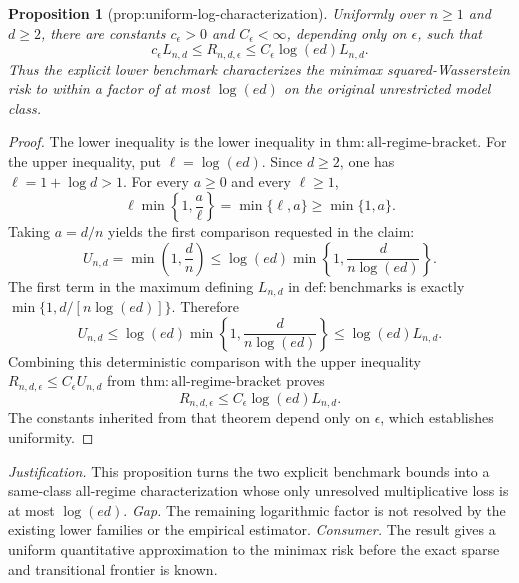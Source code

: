 \documentclass{article}
\newtheorem{proposition}{Proposition}
\begin{document}
\begin{proposition}[prop:uniform-log-characterization]\label{prop:uniform-log-characterization}
Uniformly over \(n\geq1\) and \(d\geq2\), there are constants \(c_\epsilon>0\) and \(C_\epsilon<\infty\), depending only on \(\epsilon\), such that
\[
 c_\epsilon L_{n,d}\leq R_{n,d,\epsilon}
 \leq C_\epsilon\log(ed)L_{n,d}.
\]
Thus the explicit lower benchmark characterizes the minimax squared-Wasserstein risk to within a factor of at most \(\log(ed)\) on the original unrestricted model class.
\end{proposition}
\begin{proof}
The lower inequality is the lower inequality in \(\mathrm{thm:all\mbox{-}regime\mbox{-}bracket}\).  For the upper inequality, put \(\ell=\log(ed)\).  Since \(d\geq2\), one has \(\ell=1+\log d>1\).  For every \(a\geq0\) and every \(\ell\geq1\),
\[
 \ell\min\!\left\{1,\frac a\ell\right\}=\min\{\ell,a\}\geq\min\{1,a\}.
\]
Taking \(a=d/n\) yields the first comparison requested in the claim:
\[
 U_{n,d}=\min\!\left(1,\frac dn\right)
 \leq \log(ed)\min\!\left\{1,\frac{d}{n\log(ed)}\right\}.
\]
The first term in the maximum defining \(L_{n,d}\) in \(\mathrm{def:benchmarks}\) is exactly \(\min\{1,d/[n\log(ed)]\}\).  Therefore
\[
 U_{n,d}
 \leq \log(ed)\min\!\left\{1,\frac{d}{n\log(ed)}\right\}
 \leq \log(ed)L_{n,d}.
\]
Combining this deterministic comparison with the upper inequality \(R_{n,d,\epsilon}\leq C_\epsilon U_{n,d}\) from \(\mathrm{thm:all\mbox{-}regime\mbox{-}bracket}\) proves
\[
 R_{n,d,\epsilon}\leq C_\epsilon\log(ed)L_{n,d}.
\]
The constants inherited from that theorem depend only on \(\epsilon\), which establishes uniformity.
\end{proof}
\par\smallskip\noindent \textit{Justification.} This proposition turns the two explicit benchmark bounds into a same-class all-regime characterization whose only unresolved multiplicative loss is at most \(\log(ed)\). \textit{Gap.} The remaining logarithmic factor is not resolved by the existing lower families or the empirical estimator. \textit{Consumer.} The result gives a uniform quantitative approximation to the minimax risk before the exact sparse and transitional frontier is known.
\end{document}
